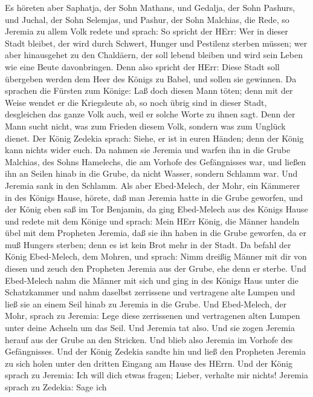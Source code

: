  Es höreten aber Saphatja, der Sohn Mathans, und Gedalja,
der Sohn Pashurs, und Juchal, der Sohn Selemjas, und Pashur, der Sohn
Malchias, die Rede, so Jeremia zu allem Volk redete und sprach:
 So spricht der HErr: Wer in dieser Stadt bleibet, der wird
durch Schwert, Hunger und Pestilenz sterben müssen; wer aber hinausgehet
zu den Chaldäern, der soll lebend bleiben und wird sein Leben wie eine
Beute davonbringen.  Denn also spricht der HErr: Diese Stadt
soll übergeben werden dem Heer des Königs zu Babel, und sollen sie
gewinnen.  Da sprachen die Fürsten zum Könige: Laß doch
diesen Mann töten; denn mit der Weise wendet er die Kriegsleute ab, so
noch übrig sind in dieser Stadt, desgleichen das ganze Volk auch, weil
er solche Worte zu ihnen sagt. Denn der Mann sucht nicht, was zum
Frieden diesem Volk, sondern was zum Unglück dienet.  Der
König Zedekia sprach: Siehe, er ist in euren Händen; denn der König kann
nichts wider euch.  Da nahmen sie Jeremia und warfen ihn in
die Grube Malchias, des Sohns Hamelechs, die am Vorhofe des Gefängnisses
war, und ließen ihn an Seilen hinab in die Grube, da nicht Wasser,
sondern Schlamm war. Und Jeremia sank in den Schlamm.  Als
aber Ebed-Melech, der Mohr, ein Kämmerer in des Königs Hause, hörete,
daß man Jeremia hatte in die Grube geworfen, und der König eben saß im
Tor Benjamin,  da ging Ebed-Melech aus des Königs Hause und
redete mit dem Könige und sprach:  Mein HErr König, die
Männer handeln übel mit dem Propheten Jeremia, daß sie ihn haben in die
Grube geworfen, da er muß Hungers sterben; denn es ist kein Brot mehr in
der Stadt.  Da befahl der König Ebed-Melech, dem Mohren,
und sprach: Nimm dreißig Männer mit dir von diesen und zeuch den
Propheten Jeremia aus der Grube, ehe denn er sterbe.  Und
Ebed-Melech nahm die Männer mit sich und ging in des Königs Haus unter
die Schatzkammer und nahm daselbst zerrissene und vertragene alte Lumpen
und ließ sie an einem Seil hinab zu Jeremia in die Grube. 
Und Ebed-Melech, der Mohr, sprach zu Jeremia: Lege diese zerrissenen und
vertragenen alten Lumpen unter deine Achseln um das Seil. Und Jeremia
tat also.  Und sie zogen Jeremia herauf aus der Grube an
den Stricken. Und blieb also Jeremia im Vorhofe des Gefängnisses.
 Und der König Zedekia sandte hin und ließ den Propheten
Jeremia zu sich holen unter den dritten Eingang am Hause des HErrn. Und
der König sprach zu Jeremia: Ich will dich etwas fragen; Lieber,
verhalte mir nichts!  Jeremia sprach zu Zedekia: Sage ich
